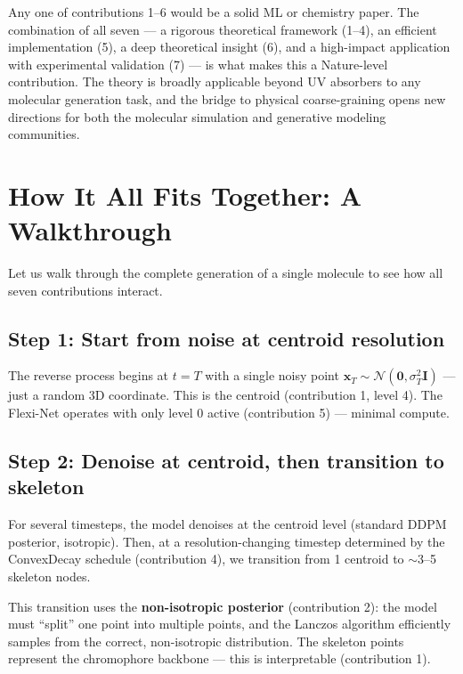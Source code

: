 \documentclass[12pt,a4paper]{article}
\newcommand{\cN}{\mathcal{N}}
\begin{document}
\vspace{1em}

\begin{insightbox}
Any one of contributions 1--6 would be a solid ML or chemistry paper. The combination of all seven --- a rigorous theoretical framework (1--4), an efficient implementation (5), a deep theoretical insight (6), and a high-impact application with experimental validation (7) --- is what makes this a Nature-level contribution. The theory is broadly applicable beyond UV absorbers to any molecular generation task, and the bridge to physical coarse-graining opens new directions for both the molecular simulation and generative modeling communities.
\end{insightbox}


\section{How It All Fits Together: A Walkthrough}

Let us walk through the complete generation of a single molecule to see how all seven contributions interact.

\subsection{Step 1: Start from noise at centroid resolution}

The reverse process begins at $t = T$ with a single noisy point $\bm{x}_T \sim \cN(\bm{0}, \sigma_T^2 \bm{I})$ --- just a random 3D coordinate. This is the centroid (contribution 1, level 4). The Flexi-Net operates with only level 0 active (contribution 5) --- minimal compute.

\subsection{Step 2: Denoise at centroid, then transition to skeleton}

For several timesteps, the model denoises at the centroid level (standard DDPM posterior, isotropic). Then, at a resolution-changing timestep determined by the ConvexDecay schedule (contribution 4), we transition from 1 centroid to $\sim$3--5 skeleton nodes.

This transition uses the \textbf{non-isotropic posterior} (contribution 2): the model must ``split'' one point into multiple points, and the Lanczos algorithm efficiently samples from the correct, non-isotropic distribution. The skeleton points represent the chromophore backbone --- this is interpretable (contribution 1).
\end{document}
